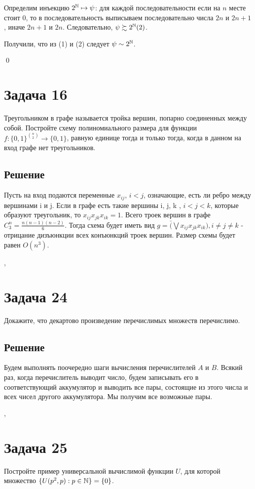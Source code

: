 \documentclass[a4paper,12pt]{article}
\begin{document}
	Определим инъекцию $2^{\mathbb{N}} \mapsto \psi$: для каждой последовательности если на $n$ месте стоит 0, то в последовательность выписываем последовательно числа $2n$ и $2n + 1$, иначе $2n + 1$ и $2n$. Следовательно, $\psi \succsim 2^{\mathbb{N}} (2)$.
	
	Получили, что из (1) и (2) следует $\psi \sim 2^{\mathbb{N}}$.
	
	\qed
	
    \section*{Задача 16}
    Треугольником в графе называется тройка вершин, попарно соединенных между собой. Постройте схему полиномиального размера для функции $f : \{0, 1\}^{n \choose 2} \rightarrow \{0, 1\}$, равную единице тогда и только тогда, когда в данном на вход графе нет треугольников.
    \subsection{Решение}
    Пусть на вход подаются переменные $x_{ij}$, $i < j$, означающие, есть ли ребро
    между вершинами i и j. Если в графе есть такие вершины i, j, k , $i < j < k$,
    которые образуют треугольник, то $x_{ij}x_{jk}x_{ik}=1$. Всего троек вершин
    в графе  $C^{n}_{3} = \frac{n(n-1)(n-2)}{6}$.  Тогда схема будет иметь вид
    $g = \bar (\bigvee x_{ij}x_{jk}x_{ik}), i \neq j \neq k$ - отрицание дизъюнкции
    всех конъюнкций троек вершин. Размер схемы будет равен $O(n^{3})$.
    
    \sep
	\section*{Задача 24}
	Докажите, что декартово произведение перечислимых множеств перечислимо.
	\subsection*{Решение}
	
	Будем выполнять поочередно шаги вычисления перечислителей $A$ и $B$. Всякий раз, когда перечислитель выводит число, будем записывать его в соответствующий аккумулятор и выводить все пары, состоящие из этого числа и всех чисел другого аккумулятора. Мы получим все возможные пары.
	
	\sep	
	
	\section*{Задача 25}
    Постройте пример универсальной вычислимой функции $U$, для которой множество $\{U(p^2, p) : p \in \mathbb{N}\} = \{0\}$.
\end{document}
